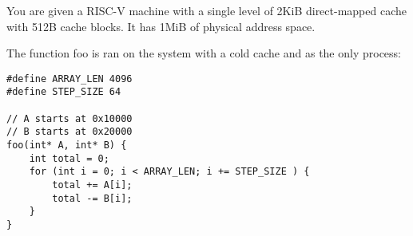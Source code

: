 \begin{blocksection}
\question
You are given a RISC-V machine with a single level of 2KiB direct-mapped cache with 512B cache blocks. It has 1MiB of physical address space.

The function foo is ran on the system with a cold cache and as the only process:

\begin{verbatim}
#define ARRAY_LEN 4096
#define STEP_SIZE 64

// A starts at 0x10000
// B starts at 0x20000
foo(int* A, int* B)	{
    int	total = 0;
    for	(int i = 0; i < ARRAY_LEN; i += STEP_SIZE ) {
        total += A[i];
        total -= B[i];
    }
}
\end{verbatim}

\end{blocksection}